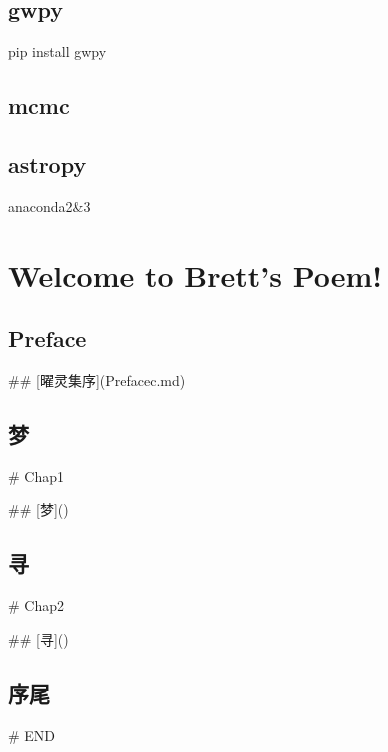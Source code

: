 \documentclass[letterpaper,10pt,english]{sphinxmanual}
\begin{document}
\section{gwpy}
\label{\detokenize{advanced/02_gwpy::doc}}\label{\detokenize{advanced/02_gwpy:gwpy}}
pip install gwpy


\section{mcmc}
\label{\detokenize{advanced/03_mcmc:mcmc}}\label{\detokenize{advanced/03_mcmc::doc}}

\section{astropy}
\label{\detokenize{advanced/04_astropy:astropy}}\label{\detokenize{advanced/04_astropy::doc}}
anaconda2\&3


\chapter{Welcome to Brett's Poem!}
\label{\detokenize{poem/index:welcome-to-brett-s-poem}}\label{\detokenize{poem/index::doc}}

\section{Preface}
\label{\detokenize{poem/Preface::doc}}\label{\detokenize{poem/Preface:preface}}
\#\# {[}曜灵集序{]}(Prefacec.md)


\section{梦}
\label{\detokenize{poem/Chap1::doc}}\label{\detokenize{poem/Chap1:id1}}
\# Chap1

\#\# {[}梦{]}()


\section{寻}
\label{\detokenize{poem/Chap2::doc}}\label{\detokenize{poem/Chap2:id1}}
\# Chap2

\#\# {[}寻{]}()


\section{序尾}
\label{\detokenize{poem/END::doc}}\label{\detokenize{poem/END:id1}}
\# END
\end{document}
